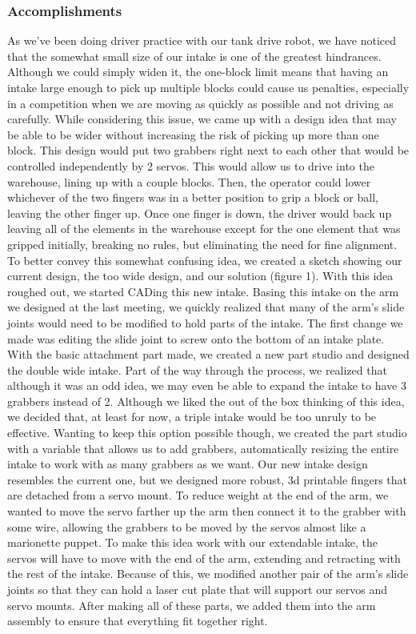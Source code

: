 \subsubsection*{Accomplishments}
As we’ve been doing driver practice with our tank drive robot, we have noticed that the somewhat small size of our intake is one of the greatest hindrances. Although we could simply widen it, the one-block limit means that having an intake large enough to pick up multiple blocks could cause us penalties, especially in a competition when we are moving as quickly as possible and not driving as carefully. While considering this issue, we came up with a design idea that may be able to be wider without increasing the risk of picking up more than one block. This design would put two grabbers right next to each other that would be controlled independently by 2 servos. This would allow us to drive into the warehouse, lining up with a couple blocks. Then, the operator could lower whichever of the two fingers was in a better position to grip a block or ball, leaving the other finger up. Once one finger is down, the driver would back up leaving all of the elements in the warehouse except for the one element that was gripped initially, breaking no rules, but eliminating the need for fine alignment. To better convey this somewhat confusing idea, we created a sketch showing our current design, the too wide design, and our solution (figure 1). 
With this idea roughed out, we started CADing this new intake. Basing this intake on the arm we designed at the last meeting, we quickly realized that many of the arm’s slide joints would need to be modified to hold parts of the intake. The first change we made was editing the slide joint to screw onto the bottom of an intake plate. 
With the basic attachment part made, we created a new part studio and designed the double wide intake. Part of the way through the process, we realized that although it was an odd idea, we may even be able to expand the intake to have 3 grabbers instead of 2. Although we liked the out of the box thinking of this idea, we decided that, at least for now, a triple intake would be too unruly to be effective. Wanting to keep this option possible though, we created the part studio with a variable that allows us to add grabbers, automatically resizing the entire intake to work with as many grabbers as we want. Our new intake design resembles the current one, but we designed more robust, 3d printable fingers that are detached from a servo mount. To reduce weight at the end of the arm, we wanted to move the servo farther up the arm then connect it to the grabber with some wire, allowing the grabbers to be moved by the servos almost like a marionette puppet. To make this idea work with our extendable intake, the servos will have to move with the end of the arm, extending and retracting with the rest of the intake. Because of this, we modified another pair of the arm’s slide joints so that they can hold a laser cut plate that will support our servos and servo mounts. After making all of these parts, we added them into the arm assembly to ensure that everything fit together right.

